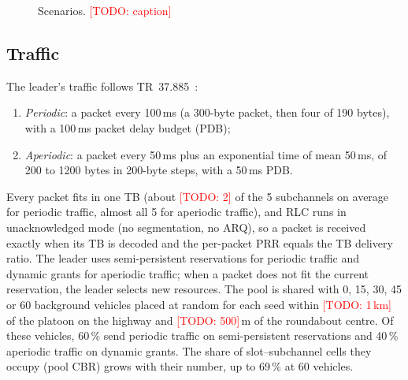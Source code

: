 \documentclass[conference]{IEEEtran}
\newcommand{\todo}[1]{\textcolor{red}{[TODO: #1]}}
\begin{document}
\begin{figure}[t]
  \centering
  \fbox{\parbox[c][3.5cm]{0.9\columnwidth}{\centering \todo{scenario figure: highway and roundabout W/E
  with the platoon, buildings and background vehicles}}}
  \caption{Scenarios. \todo{caption}}
  \label{fig:scenario}
\end{figure}

\subsection{Traffic}
The leader's traffic follows TR~37.885~\cite{3gpp_tr37885}:
\begin{enumerate}
  \item \emph{Periodic}: a packet every 100\,ms (a 300-byte packet, then four of 190 bytes), with a
        100\,ms packet delay budget (PDB);
  \item \emph{Aperiodic}: a packet every 50\,ms plus an exponential time of mean 50\,ms, of 200 to
        1200 bytes in 200-byte steps, with a 50\,ms PDB.
\end{enumerate}
Every packet fits in one TB (about \todo{2} of the 5 subchannels on average for periodic traffic, almost
all 5 for aperiodic traffic), and RLC runs in unacknowledged mode (no segmentation, no ARQ), so a packet
is received exactly when its TB is decoded and the per-packet PRR equals the TB delivery ratio. The leader
uses semi-persistent reservations for periodic traffic and dynamic grants for aperiodic traffic; when a
packet does not fit the current reservation, the leader selects new resources. The pool is shared with
0, 15, 30, 45 or 60 background vehicles placed at random for each seed within \todo{1\,km} of the platoon
on the highway and \todo{500}\,m of the roundabout centre. Of these vehicles, 60\,\% send periodic traffic
on semi-persistent reservations and 40\,\% aperiodic traffic on dynamic grants. The share of
slot--subchannel cells they occupy (pool CBR) grows with their number, up to 69\,\% at 60 vehicles.
\end{document}
